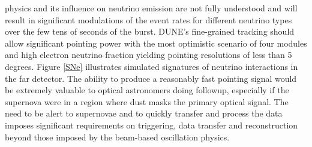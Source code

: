 \documentclass[../main-v1.tex]{subfiles}
\begin{document}
 physics and its influence on neutrino emission are not fully understood and will result in significant modulations of the event rates for different neutrino types  over the few tens of seconds of the burst.  DUNE's fine-grained tracking should allow significant pointing power with the most optimistic scenario of four modules and high electron neutrino fraction yielding pointing resolutions of less than 5 degrees.   Figure \ref{SNe} illustrates simulated signatures of  neutrino interactions in the far detector. The ability to produce a reasonably fast pointing signal would be extremely valuable to optical astronomers doing followup, especially if the supernova were in a region where dust masks the primary optical signal.   The need to be alert to supernovae and to quickly transfer and process the data imposes significant requirements on triggering, data transfer and reconstruction beyond those imposed by the %
beam-based oscillation physics. 



\end{document}
